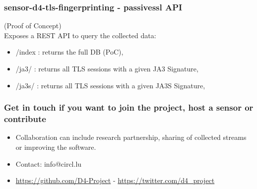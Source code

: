 \documentclass{beamer}
\begin{document}
\begin{frame}[fragile]
        \frametitle{sensor-d4-tls-fingerprinting - passivessl API} 
        (Proof of Concept) \\
        \vspace{.8cm} 
        Exposes a REST API to query the collected data:
        \begin{itemize}
          \item /index : returns the full DB (PoC), 
          \item /ja3/ : returns all TLS sessions with a given JA3 Signature,
          \item /ja3s/ : returns all TLS sessions with a given JA3S Signature,
        \end{itemize}
\end{frame}


\begin{frame}
\frametitle{Get in touch if you want to join the project, host a sensor or contribute}
\begin{itemize}
\item Collaboration can include research partnership, sharing of collected streams or improving the software.
\item Contact: info@circl.lu
\item \url{https://github.com/D4-Project} -  \url{https://twitter.com/d4_project}
\end{itemize}
\end{frame}
\end{document}
